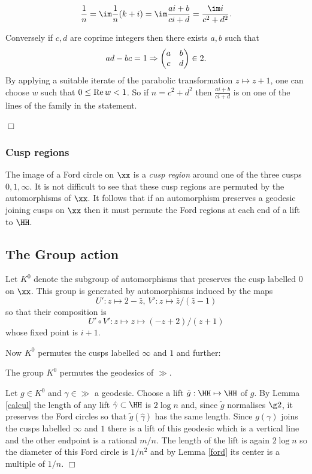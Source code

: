 $$\frac{1}{n} = \im \frac{1 }{n}(k + i)  
= \im  \frac{ai +b}{ci+d }
= \frac{\im i} {c^2 + d^2}.$$

Conversely if $c,d$ are coprime integers 
 then there exists $a,b$ such that
 $$ad - bc = 1 \Rightarrow  
 \begin{pmatrix}
 a & b \\
 c & d
 \end{pmatrix} \in \sl2.
$$
By applying a suitable iterate of the parabolic transformation 
$z \mapsto z + 1$,
one can choose $w$ such that $0 \leq \text{Re\,} w < 1$.
So if $n = c^2 + d^2$ then $\frac{ai +b}{ci+d }$
is on one of the lines of the family in the statement.

\hfill $\Box$

\subsubsection{Cusp regions}

The image of a Ford circle on $\xx$ is a \textit{cusp region}
around one of the three cusps $0,1,\infty$.
It is not difficult to see that these cusp regions 
are permuted by the automorphisms of $\xx$.
It follows that if an automorphism preserves a geodesic  joining cusps on $\xx$
then it must permute the Ford regions at each end of a lift to $\HH$.

\subsection{The Group action}

Let  $K^0$ denote 
the subgroup of automorphisms 
that preserves the cusp labelled $0$ on $\xx$.
This group is generated by  automorphisms induced by the maps
$$U': z \mapsto 2-\bar{z},\, V' : z \mapsto \bar{z}/(\bar{z} - 1)$$
so that  their composition is 
$$U'\circ V' : z \mapsto z \mapsto (-z + 2) /( z + 1)$$
whose fixed point is $i+1$.


Now $K^0$ permutes the cusps labelled $\infty$ and $1$
and further:

\begin{lem} \label{action}
 The group $K^0$  permutes the geodesics of $\gg$.
\end{lem}
\proof
Let $g \in K^0$ and $\gamma \in \gg$ a geodesic.
Choose a lift $\tilde{g} : \HH \mapsto \HH$ of $g$.
By Lemma  \ref{calcul} the  length of any lift  $\hat{\gamma} \subset \HH$ is $2\log n$
and, since $\tilde{g}$ normalises $\g2$, it preserves the Ford circles
so that  $\tilde{g}(\hat{\gamma})$ has the same length.
Since $g(\gamma)$ joins the cusps labelled $\infty$ and $1$
there is a lift of this geodesic which is a vertical line
 and the other endpoint is a rational $m/n$.
The length of the lift  is again $2 \log n$ so
the diameter of this  Ford circle is $1/n^2$
and by Lemma \ref{ford} its center is a multiple of $1/n$.
\hfill $\Box$


